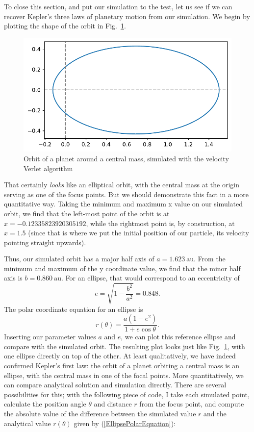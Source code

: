 \documentclass[twocolumn,apj]{openjournal}
\newcommand{\be}{\begin{equation}}
\newcommand{\ee}{\end{equation}}
\begin{document}
To close this section, and put our simulation to the test, let us see if we can recover Kepler's three laws of planetary motion from our simulation. We begin by plotting the shape of the orbit in Fig.~\ref{EllipticalOrbit}.
\begin{figure}[htbp]
\begin{center}
\includegraphics[width=\linewidth]{simulated-ellipse.pdf}
\caption{Orbit of a planet around a central mass, simulated with the velocity Verlet algorithm}
\label{EllipticalOrbit}
\end{center}
\end{figure}
That certainly {\em looks} like an elliptical orbit, with the central mass at the origin serving as one of the focus points. But we should demonstrate this fact in a more quantitative way. Taking the minimum and maximum x value on our simulated orbit, we find that the left-most point of the orbit is at $x=-0.12335823920305192$, while the rightmost point is, by construction, at $x=1.5$ (since that is where we put the initial position of our particle, its velocity pointing straight upwards).  

Thus, our simulated orbit has a major half axis of $a=1.623\:\mbox{au}$. From the minimum and maximum of the y coordinate value, we find that the minor half axis is $b=0.860\:\mbox{au}$. For an ellipse, that would correspond to an eccentricity of
\be
e = \sqrt{1-\frac{b^2}{a^2}} = 0.848.
\ee
The polar coordinate equation for an ellipse is
\be
r(\theta) = \frac{a(1-e^2)}{1+e\cos\theta}.
\label{EllipsePolarEquation}
\ee
Inserting our parameter values $a$ and $e$, we can plot this reference ellipse and compare with the simulated orbit. The resulting plot looks just like Fig.~\ref{EllipticalOrbit}, with one ellipse directly on top of the other. At least qualitatively, we have indeed confirmed Kepler's first law: the orbit of a planet orbiting a central mass is an ellipse, with the central mass in one of the focal points. More quantitatively, we can compare analytical solution and simulation directly. There are several possibilities for this; with the following piece of code, I take each simulated point, calculate the position angle $\theta$ and distance $r$ from the focus point, and compute the absolute value of the difference between the simulated value $r$ and the analytical value $r(\theta)$
given by (\ref{EllipsePolarEquation}):
\end{document}
